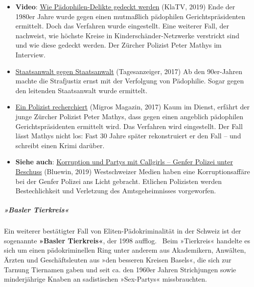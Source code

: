 \begin{itemize}
\tightlist
\item
  \textbf{Video}: \href{https://www.youtube.com/watch?v=huK-d0NJKSc}{Wie
  Pädophilen-Delikte gedeckt werden} (KlaTV, 2019) Ende der 1980er Jahre
  wurde gegen einen mutmaßlich pädophilen Gerichtspräsidenten ermittelt.
  Doch das Verfahren wurde eingestellt. Eine weiterer Fall, der
  nachweist, wie höchste Kreise in Kinderschänder-Netzwerke verstrickt
  sind und wie diese gedeckt werden. Der Zürcher Polizist Peter Mathys
  im Interview.
\item
  \href{https://www.tagesanzeiger.ch/zuerich/region/staatsanwalt-gegen-staatsanwalt/story/20223673}{Staatsanwalt
  gegen Staatsanwalt} (Tagesanzeiger, 2017) Ab den 90er-Jahren machte
  die Strafjustiz ernst mit der Verfolgung von Pädophilie. Sogar gegen
  den leitenden Staatsanwalt wurde ermittelt.
\item
  \href{https://www.migrosmagazin.ch/ein-polizist-recherchiert}{Ein
  Polizist recherchiert} (Migros Magazin, 2017) Kaum im Dienst, erfährt
  der junge Zürcher Polizist Peter Mathys, dass gegen einen angeblich
  pädophilen Gerichtspräsidenten ermittelt wird. Das Verfahren wird
  eingestellt. Der Fall lässt Mathys nicht los: Fast 30 Jahre später
  rekonstruiert er den Fall -- und schreibt einen Krimi darüber.
\item
  \textbf{Siehe auch}:
  \href{https://www.bluewin.ch/de/news/vermischtes/korruption-und-partys-mit-callgirls-genfer-polizei-unter-beschuss-236611.html}{Korruption
  und Partys mit Callgirls -- Genfer Polizei unter Beschuss} (Bluewin,
  2019) Westschweizer Medien haben eine Korruptionsaffäre bei der Genfer
  Polizei ans Licht gebracht. Etlichen Polizisten werden Bestechlichkeit
  und Verletzung des Amtsgeheimnisses vorgeworfen.
\end{itemize}

\hypertarget{basler-tierkreis}{%
\subparagraph{\texorpdfstring{\textbf{»Basler
Tierkreis«}}{»Basler Tierkreis«}}\label{basler-tierkreis}}

Ein weiterer bestätigter Fall von Eliten-Pädokriminalität in der Schweiz
ist der sogenannte \textbf{»Basler Tierkreis«}, der 1998 aufflog.~ Beim
»Tierkreis« handelte es sich um einen pädokriminellen Ring unter anderem
aus Akademikern, Anwälten, Ärzten und Geschäftsleuten aus »den besseren
Kreisen Basels«, die sich zur Tarnung Tiernamen gaben und seit ca. den
1960er Jahren Strichjungen sowie minderjährige Knaben an sadistischen
»Sex-Partys« missbrauchten.

